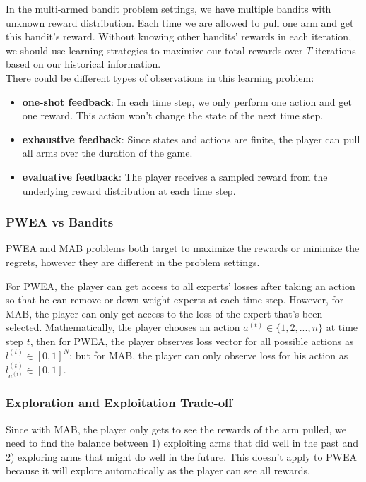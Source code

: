 \documentclass[11pt]{article}
\begin{document}
In the multi-armed bandit problem settings, we have multiple bandits with unknown reward distribution. Each time we are allowed to pull one arm and get this bandit's reward. Without knowing other bandits' rewards in each iteration, we should use learning strategies to maximize our total rewards over $T$ iterations based on our historical information. \\



There could be different types of observations in this learning problem:
\begin{itemize}
    \item \textbf{one-shot feedback}: In each time step, we only perform one action and get one reward. This action won't change the state of the next time step.
    \item \textbf{exhaustive feedback}: Since states and actions are finite, the player can pull all arms over the duration of the game. 
    \item \textbf{evaluative feedback}: The player receives a sampled reward from the underlying reward distribution at each time step.
\end{itemize}

\subsubsection{PWEA vs Bandits}
PWEA and MAB problems both target to maximize the rewards or minimize the regrets, however they are different in the problem settings.

For PWEA, the player can get access to all experts' losses after taking an action so that he can remove or down-weight experts at each time step. However, for MAB, the player can only get access to the loss of the expert that's been selected. Mathematically, the player chooses an action $a^{(t)} \in \{1,2, ..., n\}$ at time step $t$, then for PWEA, the player observes loss vector for all possible actions as $l^{(t)}\in [0,1]^N$; but for MAB, the player can only observe loss for his action as $l^{(t)}_{a^{(t)}}\in [0,1]$.


\subsubsection{Exploration and Exploitation Trade-off}

Since with MAB, the player only gets to see the rewards of the arm pulled, we need to find the balance between 1) exploiting arms that did well in the past and 2) exploring arms that might do well in the future. This doesn't apply to PWEA because it will explore automatically as the player can see all rewards.
\end{document}

